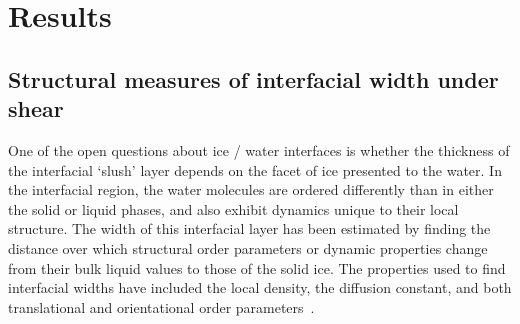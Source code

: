 

\section{Results}

\subsection{Structural measures of interfacial width under shear}\label{structure}
One of the open questions about ice / water interfaces is whether the
thickness of the interfacial `slush' layer depends on the facet
of ice presented to the water. In the interfacial region, the water
molecules are ordered differently than in either the solid or liquid
phases, and also exhibit dynamics unique to their local structure.
The width of this interfacial layer has been estimated by finding the
distance over which structural order parameters or dynamic properties
change from their bulk liquid values to those of the solid ice. The
properties used to find interfacial widths have included the local
density, the diffusion constant, and both translational and
orientational order
parameters~\cite{Karim1988,Karim1990,Hayward2001,Hayward2002,Bryk2002,Gay2002,Louden2013a}.


